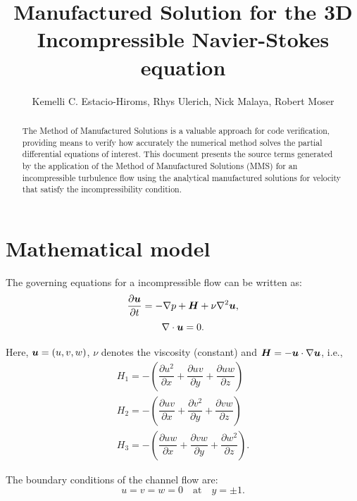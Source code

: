 \documentclass[10pt]{article}
\title{Manufactured Solution for the 3D Incompressible Navier-Stokes equation}
\author{Kemelli C. Estacio-Hiroms, Rhys Ulerich, Nick Malaya, Robert Moser}
\newcommand{\diff}[2] {\dfrac{\partial #1}{\partial #2}}
\newcommand{\bv}[1]{\ensuremath{\mbox{\boldmath$ #1 $}}}
\begin{document}
	
\maketitle


 
\begin{abstract}
The Method of Manufactured Solutions is a valuable approach for code verification, providing means to verify how accurately the numerical method solves the partial differential equations of interest.
This document presents the source terms generated by the application of the Method of Manufactured Solutions (MMS) for an incompressible turbulence flow  using the analytical manufactured solutions for velocity that satisfy the incompressibility condition.
\end{abstract}

\tableofcontents



\section{Mathematical model}
The governing equations for a incompressible flow can be written as:%
\begin{equation}
 \label{eq:ns_01}
\diff{\bv{u}}{t}  = -\nabla p +\bv{H} +  \nu \nabla^2 \bv{u},
\end{equation}
\begin{equation}
 \label{eq:ns_02}
\nabla \cdot \bv{u} = 0.
\end{equation}




Here, $\bv{u}=(u,v,w)$,  $\nu$ denotes the viscosity (constant) and $\bv{H}=-\bv{u}\cdot\nabla\bv{u}$, i.e.,
\begin{eqnarray}
 H_1 = - \left(\diff{ u^2}{x}+\diff{ uv }{y} +\diff{ uw}{z} \right)\\
 H_2 = - \left(\diff{ uv }{x}+\diff{ v^2}{y} +\diff{ vw}{z} \right)\\
 H_3 = - \left(\diff{ uw }{x}+\diff{ vw }{y} +\diff{ w^2}{z} \right).
\end{eqnarray}

The boundary conditions of the channel flow are:
$$u=v=w =0 \quad \mbox{at} \quad y=\pm 1.$$
\end{document}
